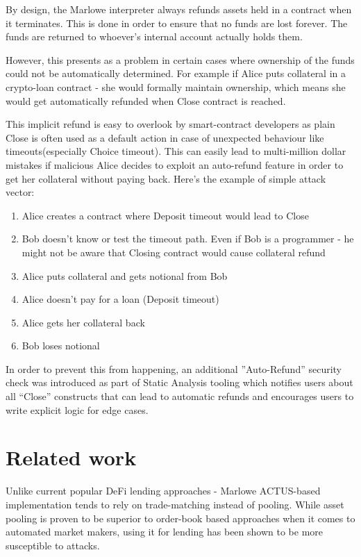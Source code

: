 \documentclass[runningheads]{llncs}
\begin{document}
By design, the Marlowe interpreter always refunds assets held in a
contract when it terminates. This is done in order to ensure that
no funds are lost forever. The funds are returned to whoever's internal
account actually holds them.

However, this presents as a problem in certain cases where ownership
of the funds could not be automatically determined. For example if
Alice puts collateral in a crypto-loan contract - she would formally
maintain ownership, which means she would get automatically refunded
when Close contract is reached.

This implicit refund is easy to overlook by smart-contract developers
as plain Close is often used as a default action in case of unexpected
behaviour like timeouts(especially Choice timeout). This can easily
lead to multi-million dollar mistakes if malicious Alice decides to
exploit an auto-refund feature in order to get her collateral without
paying back. Here's the example of simple attack vector: 
\begin{enumerate}
\item Alice creates a contract where Deposit timeout would lead to Close 
\item Bob doesn't know or test the timeout path. Even if Bob is a programmer
- he might not be aware that Closing contract would cause collateral
refund 
\item Alice puts collateral and gets notional from Bob 
\item Alice doesn't pay for a loan (Deposit timeout) 
\item Alice gets her collateral back 
\item Bob loses notional 
\end{enumerate}
In order to prevent this from happening, an additional ''Auto-Refund''
security check was introduced as part of Static Analysis tooling which
notifies users about all ``Close'' constructs that can lead to automatic
refunds and encourages users to write explicit logic for edge cases.

\section{Related work}\label{related}



Unlike current popular DeFi lending approaches - Marlowe ACTUS-based
implementation tends to rely on trade-matching instead of pooling.
While asset pooling is proven to be superior to order-book based approaches
when it comes to automated market makers, using it for lending has
been shown to be more susceptible to attacks\cite{flash-loan}.
\end{document}

